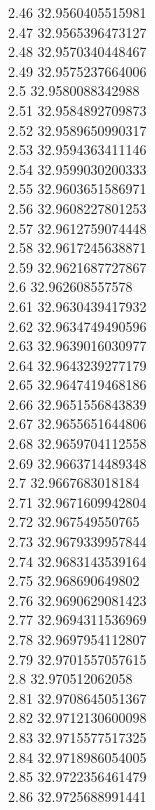 {2.46	32.9560405515981\\
2.47	32.9565396473127\\
2.48	32.9570340448467\\
2.49	32.9575237664006\\
2.5	32.9580088342988\\
2.51	32.9584892709873\\
2.52	32.9589650990317\\
2.53	32.9594363411146\\
2.54	32.9599030200333\\
2.55	32.9603651586971\\
2.56	32.9608227801253\\
2.57	32.9612759074448\\
2.58	32.9617245638871\\
2.59	32.9621687727867\\
2.6	32.962608557578\\
2.61	32.9630439417932\\
2.62	32.9634749490596\\
2.63	32.9639016030977\\
2.64	32.9643239277179\\
2.65	32.9647419468186\\
2.66	32.9651556843839\\
2.67	32.9655651644806\\
2.68	32.9659704112558\\
2.69	32.9663714489348\\
2.7	32.9667683018184\\
2.71	32.9671609942804\\
2.72	32.967549550765\\
2.73	32.9679339957844\\
2.74	32.9683143539164\\
2.75	32.968690649802\\
2.76	32.9690629081423\\
2.77	32.9694311536969\\
2.78	32.9697954112807\\
2.79	32.9701557057615\\
2.8	32.970512062058\\
2.81	32.9708645051367\\
2.82	32.9712130600098\\
2.83	32.9715577517325\\
2.84	32.9718986054005\\
2.85	32.9722356461479\\
2.86	32.9725688991441\\
}
